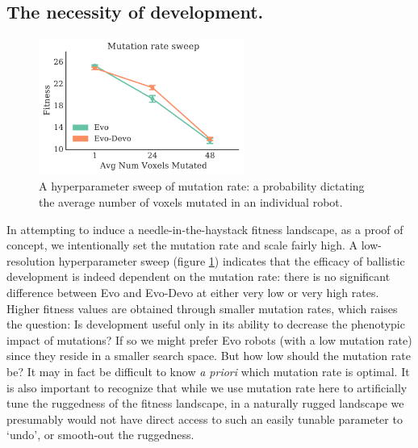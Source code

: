 


\subsection{The necessity of development.}

\begin{figure}
\centering
\includegraphics[width=0.6\textwidth]{Chapter03/img/sweep_gecco}
\caption{\label{fig:hyperparam_sweep} A hyperparameter sweep of mutation rate: a probability dictating the average number of voxels mutated in an individual robot.}
\end{figure}


In attempting to induce a needle-in-the-haystack fitness landscape, as a proof of concept, we intentionally set the mutation rate and scale fairly high.
A low-resolution hyperparameter sweep (figure \ref{fig:hyperparam_sweep}) indicates that the efficacy of ballistic development is indeed dependent on the mutation rate: there is no significant difference between Evo and Evo-Devo at either very low or very high rates. 
Higher fitness values are obtained through smaller mutation rates, which raises the question: Is development useful only in its ability to decrease the phenotypic impact of mutations?
If so we might prefer Evo robots (with a low mutation rate) since they reside in a smaller search space. 
But how low should the mutation rate be? 
It may in fact be difficult to know \textit{a priori} which mutation rate is optimal.
It is also important to recognize that while we use mutation rate here to artificially tune the ruggedness of the fitness landscape, in a naturally rugged landscape we presumably would not have direct access to such an easily tunable parameter to `undo', or smooth-out the ruggedness.


